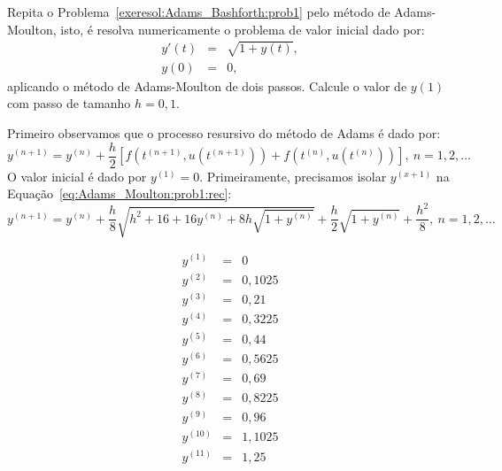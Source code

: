 \begin{exeresol}\label{exeresol:Adams_Moulton:prob1} Repita o Problema~\ref{exeresol:Adams_Bashforth:prob1} pelo método de Adams-Moulton, isto, é  resolva numericamente o problema de valor inicial dado por:
\begin{eqnarray}
 y'(t)&=& \sqrt{1+y(t)},\\
 y(0)&=& 0,
\end{eqnarray}
aplicando o método de Adams-Moulton de dois passos. Calcule o valor de $y(1)$ com passo de tamanho $h=0,1$.
\end{exeresol}
\begin{resol}
Primeiro observamos que o processo resursivo do método de Adams é dado por:
\begin{equation}\label{eq:Adams_Moulton:prob1:rec}
  y^{(n+1)}=y^{(n)}+\frac{h}{2}\left[f\left(t^{(n+1)},u(t^{(n+1)})\right)+f\left(t^{(n)},u(t^{(n)})\right)\right],~n=1,2,\ldots
 \end{equation}
O valor inicial é dado por $y^{(1)}=0$. Primeiramente, precisamos isolar $y^{(x+1)}$ na Equação~\ref{eq:Adams_Moulton:prob1:rec}:
\begin{equation}
  y^{(n+1)}=y^{(n)}+\frac{h}{8} \sqrt {{h}^{2}+16+16y^{(n)}+8h\sqrt {1+y^{(n)}}} +\frac{h}{2}\sqrt {1+y^{(n)}}+\frac{h^2}{8},~n=1,2,\ldots
 \end{equation}

  \begin{eqnarray}
 y^{(1)}&=&0\\
 y^{(2)}&=&0,1025\\
y^{(3)}&=&0,21\\
y^{(4)}&=&0,3225\\
y^{(5)}&=&0,44\\
y^{(6)}&=&0,5625\\
y^{(7)}&=&0,69\\
y^{(8)}&=&0,8225\\
y^{(9)}&=&0,96\\
y^{(10)}&=&1,1025\\
y^{(11)}&=&1,25
\end{eqnarray}

\end{resol}


